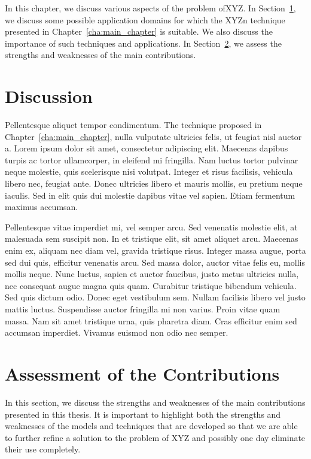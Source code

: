 In this chapter, we discuss various aspects of the problem ofXYZ. In Section~\ref{sec:discussion}, we discuss some possible application domains for which the XYZn technique presented in Chapter~\ref{cha:main_chapter} is suitable. We also discuss the importance of such techniques and applications. In Section~\ref{sec:assessment_of_the_contributions}, we assess the strengths and weaknesses of the main contributions. 

\section{Discussion}
\label{sec:discussion}

Pellentesque aliquet tempor condimentum. The technique proposed in Chapter~\ref{cha:main_chapter}, nulla vulputate ultricies felis, ut feugiat nisl auctor a. Lorem ipsum dolor sit amet, consectetur adipiscing elit. Maecenas dapibus turpis ac tortor ullamcorper, in eleifend mi fringilla. Nam luctus tortor pulvinar neque molestie, quis scelerisque nisi volutpat. Integer et risus facilisis, vehicula libero nec, feugiat ante. Donec ultricies libero et mauris mollis, eu pretium neque iaculis. Sed in elit quis dui molestie dapibus vitae vel sapien. Etiam fermentum maximus accumsan. \newline

Pellentesque vitae imperdiet mi, vel semper arcu. Sed venenatis molestie elit, at malesuada sem suscipit non. In et tristique elit, sit amet aliquet arcu. Maecenas enim ex, aliquam nec diam vel, gravida tristique risus. Integer massa augue, porta sed dui quis, efficitur venenatis arcu. Sed massa dolor, auctor vitae felis eu, mollis mollis neque. Nunc luctus, sapien et auctor faucibus, justo metus ultricies nulla, nec consequat augue magna quis quam. Curabitur tristique bibendum vehicula. Sed quis dictum odio. Donec eget vestibulum sem. Nullam facilisis libero vel justo mattis luctus. Suspendisse auctor fringilla mi non varius. Proin vitae quam massa. Nam sit amet tristique urna, quis pharetra diam. Cras efficitur enim sed accumsan imperdiet. Vivamus euismod non odio nec semper.


\section{Assessment of the Contributions}
\label{sec:assessment_of_the_contributions}

In this section, we discuss the strengths and weaknesses of the main contributions presented in this thesis. It is important to highlight both the strengths and weaknesses of the models and techniques that are developed so that we are able to further refine a solution to the problem of XYZ and possibly one day eliminate their use completely.

